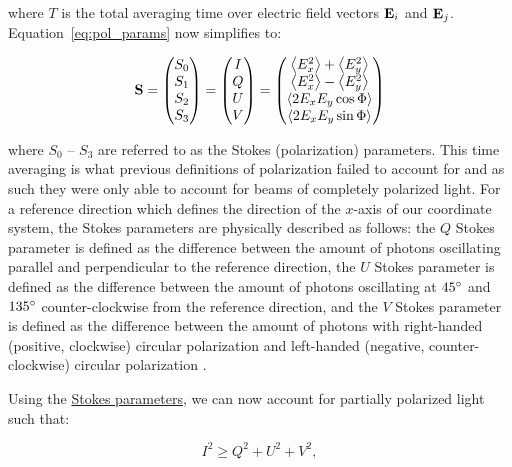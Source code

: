 \noindent where $T$ is the total averaging time over electric field vectors $\mathbf{E}_{i}$ and $\mathbf{E}_{j}$. Equation~\ref{eq:pol_params} now simplifies to:

\begin{equation}
    \mathbf{S} = 
    \begin{pmatrix}
        S_{0} \\
        S_{1} \\
        S_{2} \\
        S_{3}
    \end{pmatrix}
    =
    \begin{pmatrix}
        I \\
        Q \\
        U \\
        V
    \end{pmatrix}
    =
    \begin{pmatrix}
        \left< E_{x}^{2} \right> + \left< E_{y}^{2} \right> \\
        \left< E_{x}^{2} \right> - \left< E_{y}^{2} \right> \\
        \left< 2 E_{x} E_{y} \cos \Phi \right> \\
        \left< 2 E_{x} E_{y} \sin \Phi \right>
    \end{pmatrix}
    \label{eq:Stokes_params}
\end{equation}

\noindent where $S_{0}$ -- $ S_{3}$ are referred to as the Stokes (polarization) parameters. This time averaging is what previous definitions of polarization failed to account for and as such they were only able to account for beams of completely polarized light. For a reference direction which defines the direction of the $x$-axis of our coordinate system, the Stokes parameters are physically described as follows: the $Q$ Stokes parameter is defined as the difference between the amount of photons oscillating parallel and perpendicular to the reference direction, the $U$ Stokes parameter is defined as the difference between the amount of photons oscillating at $45\hbox{$^\circ$}$ and $135\hbox{$^\circ$}$ counter-clockwise from the reference direction, and the $V$ Stokes parameter is defined as the difference between the amount of photons with right-handed (positive, clockwise) circular polarization and left-handed (negative, counter-clockwise) circular polarization \citep{Stokes}.
\prgph

Using the \hyperref[eq:Stokes_params]{Stokes parameters}, we can now account for partially polarized light such that:

\begin{equation}
    I^{2} \geq  Q^{2} + U^{2} + V^{2},
\end{equation}

